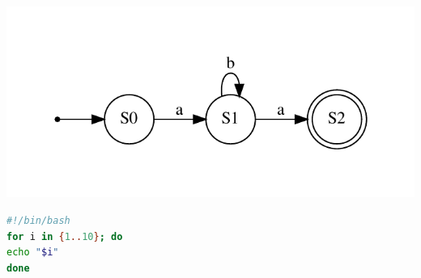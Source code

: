 ~\autocite[S.55]{mf2005}

\includegraphics[width=\linewidth]{src/abbildungen/fsm}

\begin{lstlisting}[language=bash,caption={Ein Listing},captionpos=b,frame=tb]
#!/bin/bash
for i in {1..10}; do
echo "$i"
done
\end{lstlisting}

